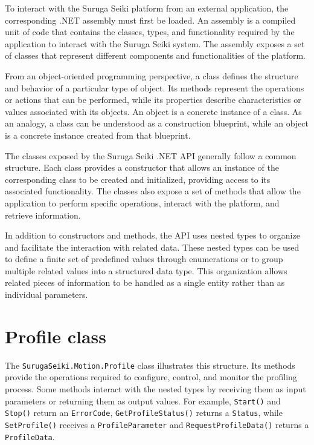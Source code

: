 \documentclass[../main.tex]{subfiles}
\begin{document}
To interact with the Suruga Seiki platform from an external application, the corresponding .NET assembly must first be loaded. An assembly is a compiled unit of code that contains the classes, types, and functionality required by the application to interact with the Suruga Seiki system. The assembly exposes a set of classes that represent different components and functionalities of the platform.

From an object-oriented programming perspective, a class defines the structure and behavior of a particular type of object. Its methods represent the operations or actions that can be performed, while its properties describe characteristics or values associated with its objects. An object is a concrete instance of a class. As an analogy, a class can be understood as a construction blueprint, while an object is a concrete instance created from that blueprint.

The classes exposed by the Suruga Seiki .NET API generally follow a common structure. Each class provides a constructor that allows an instance of the corresponding class to be created and initialized, providing access to its associated functionality. The classes also expose a set of methods that allow the application to perform specific operations, interact with the platform, and retrieve information.

In addition to constructors and methods, the API uses nested types to organize and facilitate the interaction with related data. These nested types can be used to define a finite set of predefined values through enumerations or to group multiple related values into a structured data type. This organization allows related pieces of information to be handled as a single entity rather than as individual parameters.

\section{Profile class}
\label{sec:profile_class}

The \texttt{SurugaSeiki.Motion.Profile} class illustrates this structure. Its methods provide the operations required to configure, control, and monitor
the profiling process. Some methods interact with the nested types by receiving them as input parameters or returning them as output values. For example, \texttt{Start()} and \texttt{Stop()} return an \texttt{ErrorCode}, \texttt{GetProfileStatus()} returns a \texttt{Status}, while \texttt{SetProfile()} receives a \texttt{ProfileParameter} and \texttt{RequestProfileData()} returns a \texttt{ProfileData}.
\end{document}
